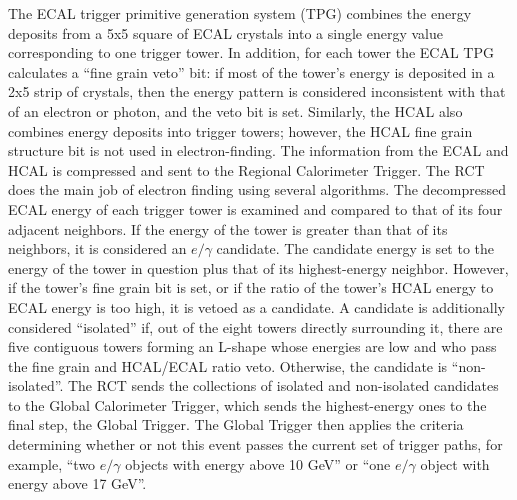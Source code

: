 The ECAL trigger primitive generation system (TPG) combines the energy deposits 
from a 5x5 square of ECAL crystals into a single energy value corresponding to 
one trigger tower.%
In addition, for each tower the ECAL TPG calculates a ``fine grain veto'' bit: 
if most of the tower's energy is deposited in a 2x5 strip of crystals, 
then the energy pattern is considered inconsistent with that of an electron
or photon, 
and the veto bit is set.  
Similarly, the HCAL also combines energy deposits into trigger towers; 
however, the HCAL fine grain structure bit is not used in electron-finding.  
The information from the ECAL and HCAL is compressed and sent to the 
Regional Calorimeter Trigger.  
The RCT does the main job of electron finding using several algorithms.  
The decompressed ECAL energy of each trigger tower is examined and 
compared to that of its four adjacent neighbors.  
If the energy of the tower is greater than that of its neighbors, 
it is considered an $e/\gamma$ candidate.  
The candidate energy is set to the energy of the tower in question 
plus that of its highest-energy neighbor.  
However, if the tower's fine grain bit is set, 
or if the ratio of the tower's HCAL energy to ECAL energy is too high, 
it is vetoed as a candidate.  
A candidate is additionally considered ``isolated'' if, 
out of the eight towers directly surrounding it, 
there are five contiguous towers forming an L-shape whose 
energies are low and who pass the fine grain and HCAL/ECAL ratio veto.  
Otherwise, the candidate is ``non-isolated''.  
The RCT sends the collections of isolated and non-isolated candidates to the 
Global Calorimeter Trigger, 
which sends the highest-energy ones to the final step, the Global Trigger.  
The Global Trigger then applies the criteria determining whether or not 
this event passes the current set of trigger paths,
for example, ``two $e/\gamma$ objects with energy above 10 GeV'' 
or ``one $e/\gamma$ object with energy above 17 GeV''.  




